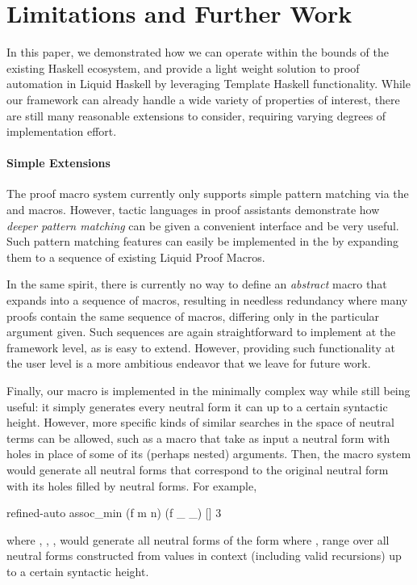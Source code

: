 \section{Limitations and Further Work}
\label{sec:future}

In this paper, we demonstrated how we can operate within the bounds of
the existing Haskell ecosystem, and provide a light weight solution to
proof automation in Liquid Haskell by leveraging Template Haskell
functionality. While our framework can already handle a wide variety
of properties of interest, there are still many reasonable extensions
to consider, requiring varying degrees of implementation effort.


\paragraph{Simple Extensions}

The proof macro system currently only supports simple pattern matching
via the  and  macros. However, tactic
languages in proof assistants demonstrate how {\em deeper pattern
  matching} can be given a convenient interface and be very
useful. Such pattern matching features can easily be implemented in
the \LangA by expanding them to a sequence of existing Liquid Proof Macros.

In the same spirit, there is currently no way to define an
\textit{abstract} macro that expands into a sequence of macros,
resulting in needless redundancy where many proofs contain the same
sequence of macros, differing only in the particular argument given.
Such sequences are again straightforward to implement at the framework
level, as \LangA is easy to extend. However, providing such
functionality at the user level is a more ambitious endeavor that we
leave for future work.

Finally, our  macro is implemented in the minimally complex way
while still being useful: it simply generates every neutral form it can up
to a certain syntactic height.  However, more specific kinds of
similar searches in the space of neutral terms can be allowed, such as
a  macro that take as input a neutral form with holes
in place of some of its (perhaps nested) arguments. Then, the macro
system would generate all neutral forms that correspond to the
original neutral form with its holes filled by neutral forms. For
example,
\begin{code}
  refined-auto {assoc_min (f m n) (f _ _)} [] 3
\end{code}
where , , ,
would generate all neutral forms of the form  where 
,  range over all neutral forms constructed from values in
context (including valid recursions) up to a certain syntactic height.

